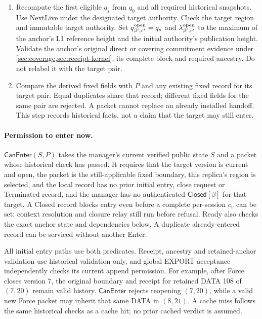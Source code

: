 \documentclass[11pt,a4paper]{article}
\newcommand{\tagg}[1]{\ensuremath{\mathsf{#1}}}
\begin{document}
\begin{enumerate}[label=(\roman*),itemsep=2pt]
including original provenance. Verify the zero or positive accepted
count rather than inferring it from the anchor's producer.
For an unassigned boundary, verify its stored target slot and any
intervening Forces. A later Force supersedes entry permission without
invalidating the earlier boundary's historical evidence.
\item Recompute the first eligible $q_s$ from $q_0$ and all required
historical snapshots. Use NextLive under the designated target authority. Check the target region and immutable target authority.
Set $q^{\rm open}_{\beta',r'}=q_s$ and
$\lambda^{\rm open}_{\beta',r'}$ to the maximum of the anchor's L1
reference height and the initial authority's publication height.
Validate the anchor's original direct or covering commitment evidence
under \cref{sec:coverage,sec:receipt-kernel}, its complete block and
required ancestry.
Do not relabel it with the target pair.
\item Compare the derived fixed fields with $P$ and any existing
fixed record for its target pair. Equal duplicates share that record;
different fixed fields for the same pair are rejected. A packet cannot
replace an already installed handoff. This step records historical facts,
not a claim that the target may still enter.
\end{enumerate}

\paragraph{Permission to enter now.}
\label{sec:can-enter}
$\tagg{CanEnter}(S,P)$ takes the manager's current verified public state
$S$ and a packet whose historical check has passed. It requires that the
target version is current and open, the packet is the still-applicable
fixed boundary, this replica's region is selected, and the local record
has no prior initial entry, close request or Terminated record, and the
manager has no authenticated $\tagg{Closed}[\beta]$ for that target.
A Closed record blocks entry even before a complete per-session $c_v$
can be set; context resolution and closure relay still run before refusal. Ready
also checks the exact anchor state and dependencies below. A duplicate
already-entered record can be serviced without another Enter.

All initial entry paths use both predicates. Receipt, ancestry and
retained-anchor validation use historical validation only, and global
EXPORT acceptance independently checks its current append permission.
For example, after Force closes version 7, the original boundary and
receipt for retained DATA 108 of $(7,20)$ remain valid history.
$\tagg{CanEnter}$ rejects reopening $(7,20)$, while a valid new Force
packet may inherit that same DATA in $(8,21)$. A cache miss follows the
same historical checks as a cache hit; no prior cached verdict is assumed.
\end{document}
